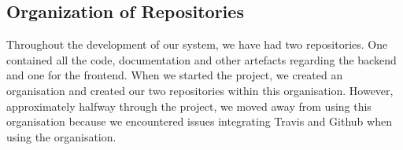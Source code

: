 \subsection{Organization of Repositories}

Throughout the development of our system, we have had two repositories. One contained all the code, documentation and other artefacts regarding the backend and one for the frontend. When we started the project, we created an organisation and created our two repositories within this organisation. However, approximately halfway through the project, we moved away from using this organisation because we encountered issues integrating Travis and Github when using the organisation. 
